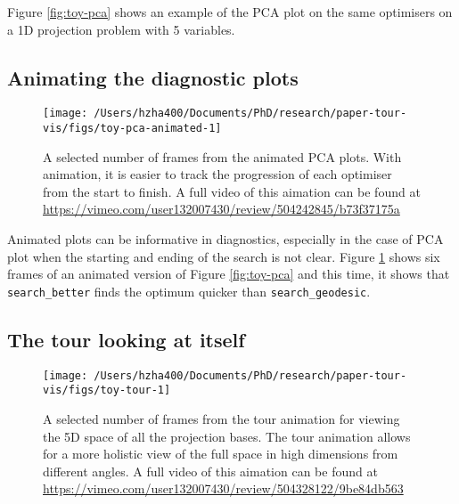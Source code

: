 Figure \ref{fig:toy-pca} shows an example of the PCA plot on the same
optimisers on a 1D projection problem with 5 variables.

\hypertarget{animating-the-diagnostic-plots}{%
\subsection{Animating the diagnostic
plots}\label{animating-the-diagnostic-plots}}

\begin{Schunk}
\begin{figure}

{\centering \texttt{[image: /Users/hzha400/Documents/PhD/research/paper-tour-vis/figs/toy-pca-animated-1]} 

}

\caption{A selected number of frames from the animated PCA plots. With animation, it is easier to track the progression of each optimiser from the start to finish. A full video of this aimation can be found at \url{https://vimeo.com/user132007430/review/504242845/b73f37175a}}\label{fig:toy-pca-animated}
\end{figure}
\end{Schunk}

Animated plots can be informative in diagnostics, especially in the case
of PCA plot when the starting and ending of the search is not clear.
Figure \ref{fig:toy-pca-animated} shows six frames of an animated
version of Figure \ref{fig:toy-pca} and this time, it shows that
\texttt{search\_better} finds the optimum quicker than
\texttt{search\_geodesic}.

\hypertarget{the-tour-looking-at-itself}{%
\subsection{The tour looking at
itself}\label{the-tour-looking-at-itself}}

\begin{Schunk}
\begin{figure}

{\centering \texttt{[image: /Users/hzha400/Documents/PhD/research/paper-tour-vis/figs/toy-tour-1]} 

}

\caption{A selected number of frames from the tour animation for viewing the 5D space of all the projection bases. The tour animation allows for a more holistic view of the full space in high dimensions from different angles. A full video of this aimation can be found at \url{https://vimeo.com/user132007430/review/504328122/9be84db563}}\label{fig:toy-tour}
\end{figure}
\end{Schunk}

